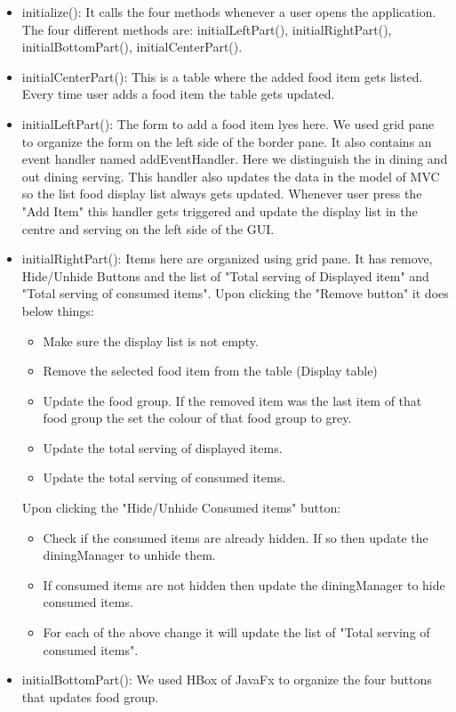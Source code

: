 \documentclass{scrreprt}
\begin{document}
\begin{itemize}
	\item initialize(): It calls the four methods whenever a user opens the application. The four different methods are: initialLeftPart(), initialRightPart(), initialBottomPart(), initialCenterPart().
	\item initialCenterPart(): This is a table where the added food item gets listed. Every time user adds a food item the table gets updated.
	\item initialLeftPart(): The form to add a food item lyes here. We used grid pane to organize the form on the left side of the border pane. It also contains an event handler named addEventHandler. Here we distinguish the in dining and out dining serving. This 				handler also updates the data in the model of MVC so the list food display list always gets updated. Whenever user press the "Add Item" this handler gets triggered and update the display list in the centre and serving on the left side of the GUI.
	\item initialRightPart(): Items here are organized using grid pane. It has remove, Hide/Unhide Buttons and the list of "Total serving of Displayed item" and "Total serving of consumed items". Upon clicking the "Remove button" it does below things:
	\begin{itemize}
		\item Make sure the display list is not empty.
		\item Remove the selected food item from the table (Display table)
		\item Update the food group. If the removed item was the last item of that food group the set the colour of that food group to grey.
		\item Update the total serving of displayed items.
		\item Update the total serving of consumed items.
	\end{itemize}
	Upon clicking the "Hide/Unhide Consumed items" button:
	\begin{itemize}
		\item Check if the consumed items are already hidden. If so then update the diningManager to unhide them.
		\item If consumed items are not hidden then update the diningManager to hide consumed items.
		\item For each of the above change it will update the list of "Total serving of consumed items".
	\end{itemize}
	\item initialBottomPart(): We used HBox of JavaFx to organize the four buttons that updates food group.

\end{itemize}
\end{document}
